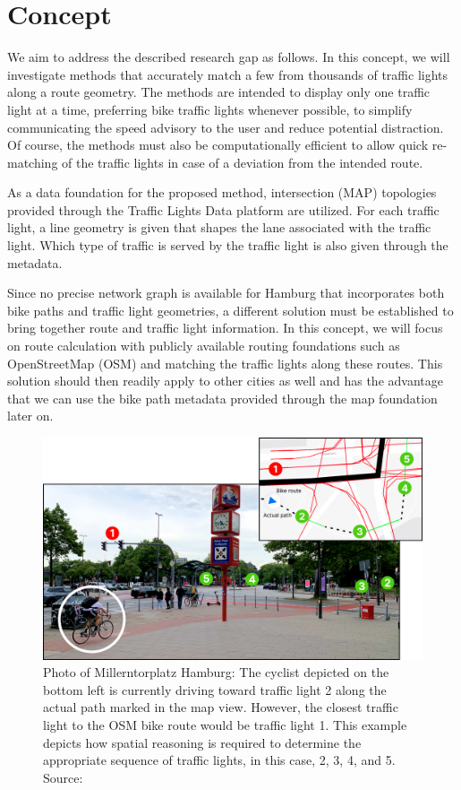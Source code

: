 \section{Concept}

We aim to address the described research gap as follows. In this concept, we will investigate methods that accurately match a few from thousands of traffic lights along a route geometry. The methods are intended to display only one traffic light at a time, preferring bike traffic lights whenever possible, to simplify communicating the speed advisory to the user and reduce potential distraction. Of course, the methods must also be computationally efficient to allow quick re-matching of the traffic lights in case of a deviation from the intended route.

As a data foundation for the proposed method, intersection (MAP) topologies provided through the Traffic Lights Data platform are utilized. For each traffic light, a line geometry is given that shapes the lane associated with the traffic light. Which type of traffic is served by the traffic light is also given through the metadata.

Since no precise network graph is available for Hamburg that incorporates both bike paths and traffic light geometries, a different solution must be established to bring together route and traffic light information. In this concept, we will focus on route calculation with publicly available routing foundations such as OpenStreetMap (OSM) and matching the traffic lights along these routes. This solution should then readily apply to other cities as well and has the advantage that we can use the bike path metadata provided through the map foundation later on.

\begin{figure}[t]
\centering
\includegraphics[width=\linewidth]{images/sg-selection-example.png}
\caption{Photo of Millerntorplatz Hamburg: The cyclist depicted on the bottom left is currently driving toward traffic light 2 along the actual path marked in the map view. However, the closest traffic light to the OSM bike route would be traffic light 1. This example depicts how spatial reasoning is required to determine the appropriate sequence of traffic lights, in this case, 2, 3, 4, and 5. Source: \cite{matthes2023geo}}
\label{fig:sg-selection-example}
\end{figure}

